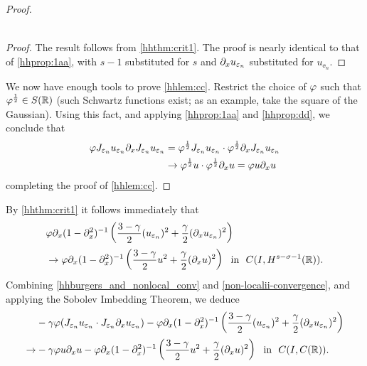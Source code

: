 \begin{proof}
\begin{proposition}
\begin{equation}
\begin{split}
\end{split}
\end{equation}
\end{proposition}
\begin{proof} The result follows from \cref{hhthm:crit1}.
The proof is nearly identical to that of
\cref{hhprop:1aa}, with $s-1$ substituted for $s$
and $\partial_x u_{\varepsilon_n}$ substituted for $u_{\ee_n}$. 
\end{proof}
%
%
We now have enough tools to prove \cref{hhlem:cc}. Restrict the
choice of $\varphi$ such that $\varphi^\frac{1}{2} \in S(\mathbb{R})$
(such Schwartz functions exist; as an example, take the square
of the Gaussian). Using this fact, and applying \cref{hhprop:1aa} and \cref{hhprop:dd}, we conclude that
\begin{equation*}
\begin{split}
\varphi J_{\varepsilon_n} u_{\varepsilon_n} \partial_x J_{\varepsilon_n} u_{\varepsilon_n} 
& = \varphi^\frac{1}{2} J_{\varepsilon_n} u_{\varepsilon_n} \cdot
\varphi^\frac{1}{2} \partial_x J_{\varepsilon_n} u_{\varepsilon_n}
\\
& \to \varphi^\frac{1}{2} u \cdot \varphi^\frac{1}{2} \partial_x u = \varphi
u \partial_x u
\end{split}
\end{equation*}
completing the proof of \cref{hhlem:cc}. 
\end{proof}
%
%
%
%
By \cref{hhthm:crit1} it follows immediately that
\begin{equation}
\begin{split}
& \varphi \partial_x(1- \partial_x^2)^{-1} \left( \frac{3-\gamma}{2}
(u_{\varepsilon_n})^2
+ \frac{\gamma}{2} (\partial_x u_{\varepsilon_n})^2 \right )
\\
& \to
\varphi \partial_x(1- \partial_x^2)^{-1} \left( \frac{3-\gamma}{2} u^2
+ \frac{\gamma}{2} (\partial_x u)^2 \right ) \ \
\text{in} \ \ C(I, H^{s-\sigma-1}(\mathbb{R})).
\label{non-localii-convergence}
\end{split}
\end{equation}
Combining \eqref{hhburgers_and_nonlocal_conv} and
\eqref{non-localii-convergence}, and applying the Sobolev Imbedding
Theorem, we deduce 
\begin{equation}
\begin{split}
& -\gamma \varphi (J_{\varepsilon_n} u_{\varepsilon_n} \cdot J_{\varepsilon_n} \partial_x
u_{\varepsilon_n}) -
\varphi \partial_x(1- \partial_x^2)^{-1} \left( \frac{3-\gamma}{2}
(u_{\varepsilon_n})^2
+ \frac{\gamma}{2} (\partial_x u_{\varepsilon_n})^2 \right )
\\
\to & -\gamma \varphi u \partial_x u -
\varphi \partial_x(1- \partial_x^2)^{-1} \left( \frac{3-\gamma}{2} u^2
+ \frac{\gamma}{2} (\partial_x u)^2 \right ) \ \
\text{in} \ \ C(I, C(\mathbb{R})).
\label{llloc-non-loc-tog}
\end{split}
\end{equation}
